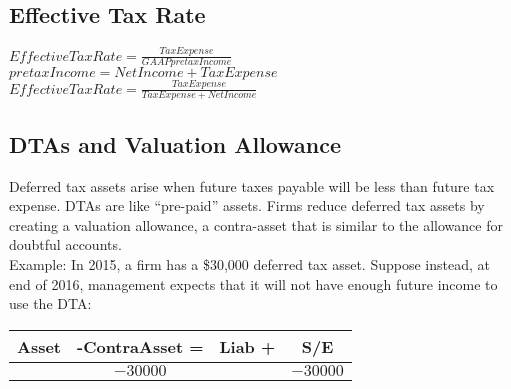 \subsection*{ Effective Tax Rate}

$EffectiveTaxRate = \frac{TaxExpense}{GAAPpretaxIncome}$  \\
$ pretaxIncome = NetIncome + TaxExpense $ \\
$EffectiveTaxRate = \frac{TaxExpense}{TaxExpense+NetIncome}$  

\subsection*{DTAs and Valuation Allowance}

Deferred tax assets arise when future taxes payable will be less than future tax expense. DTAs are like “pre-paid” assets.
Firms reduce deferred tax assets by creating a valuation allowance, a contra-asset that is
similar to the allowance for doubtful accounts.\\


Example: In 2015, a firm has a \$30,000 deferred tax asset.
Suppose instead, at end of 2016, management expects that it will not have enough future income
to use the DTA:
\begin{tabular}{ |c|c||c|c| } 
	\hline
	Asset &-ContraAsset = & Liab +  & S/E	 \\ 
	\hline
	& $-30000$ &  & $-30000$	 \\ 	
	\hline
\end{tabular} 